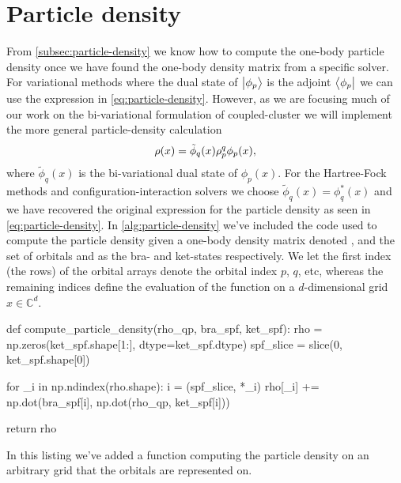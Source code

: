     \section{Particle density}
        \label{sec:particle-density}
        From \autoref{subsec:particle-density} we know how to compute the
        one-body particle density once we have found the one-body density matrix
        from a specific solver.
        For variational methods where the dual state of $\ket{\phi_p}$ is the
        adjoint $\bra{\phi_p}$ we can use the expression in
        \autoref{eq:particle-density}.
        However, as we are focusing much of our work on the bi-variational
        formulation of coupled-cluster we will implement the more general
        particle-density calculation
        \begin{align}
            \rho(x)
            = \tilde{\phi}_{q}(x)
            \rho^{q}_{p}
            \phi_p(x),
        \end{align}
        where $\tilde{\phi}_q(x)$ is the bi-variational dual state of
        $\phi_p(x)$.
        For the Hartree-Fock methods and configuration-interaction solvers we
        choose $\tilde{\phi}_q(x) = \phi^{*}_q(x)$ and we have recovered the
        original expression for the particle density as seen in
        \autoref{eq:particle-density}.
        In \autoref{alg:particle-density} we've included the code used to
        compute the particle density given a one-body density matrix denoted
        , and the set of orbitals  and 
        as the bra- and ket-states respectively.
        We let the first index (the rows) of the orbital arrays denote the
        orbital index $p$, $q$, etc, whereas the remaining indices define the
        evaluation of the function on a $d$-dimensional grid $x \in
        \mathbb{C}^{d}$.
        \begin{algorithm}
            \begin{python}
def compute_particle_density(rho_qp, bra_spf, ket_spf):
    rho = np.zeros(ket_spf.shape[1:], dtype=ket_spf.dtype)
    spf_slice = slice(0, ket_spf.shape[0])

    for _i in np.ndindex(rho.shape):
        i = (spf_slice, *_i)
        rho[_i] += np.dot(bra_spf[i], np.dot(rho_qp, ket_spf[i]))

    return rho
            \end{python}
            \caption{In this listing we've added a function computing the
            particle density on an arbitrary grid that the orbitals are
            represented on.}
            \label{alg:particle-density}
        \end{algorithm}

